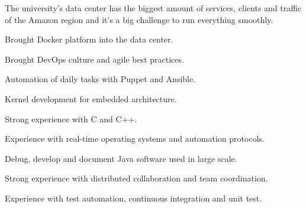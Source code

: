\documentclass[]{willianpaixao-resume}
\begin{document}
\begin{minipage}[t]{0.64\textwidth}
\sectionsep
The university's data center has the biggest amount of services, clients and
traffic of the Amazon region and it's a big challenge to run everything smoothly.
\sectionsep
\begin{tightemize}
\item Brought Docker platform into the data center.
\item Brought DevOps culture and agile best practices.
\item Automation of daily tasks with Puppet and Ansible.
\end{tightemize}
\sectionsep

\begin{tightemize}
\item Kernel development for embedded architecture.
\item Strong experience with C and C++.
\item Experience with real-time operating systems and automation protocols.
\end{tightemize}
\sectionsep

\begin{tightemize}
\item Debug, develop and document Java software used in large scale.
\item Strong experience with distributed collaboration and team coordination.
\item Experience with test automation, continuous integration and unit test.
\end{tightemize}
\sectionsep


\end{minipage}
\end{document}
